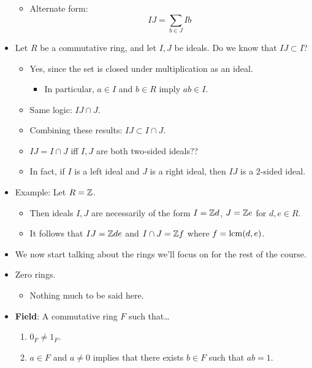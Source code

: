 \documentclass[../notes.tex]{subfiles}
\begin{document}
\begin{itemize}
\begin{itemize}
\begin{itemize}
        \end{itemize}
        \item Alternate form:
        \begin{equation*}
            IJ = \sum_{b\in J}Ib
        \end{equation*}
    \end{itemize}
    \item Let $R$ be a commutative ring, and let $I,J$ be ideals. Do we know that $IJ\subset I$?
    \begin{itemize}
        \item Yes, since the set is closed under multiplication as an ideal.
        \begin{itemize}
            \item In particular, $a\in I$ and $b\in R$ imply $ab\in I$.
        \end{itemize}
        \item Same logic: $IJ\cap J$.
        \item Combining these results: $IJ\subset I\cap J$.
        \item $IJ=I\cap J$ iff $I,J$ are both two-sided ideals??
        \item In fact, if $I$ is a left ideal and $J$ is a right ideal, then $IJ$ is a 2-sided ideal.
    \end{itemize}
    \item Example: Let $R=\mathbb{Z}$.
    \begin{itemize}
        \item Then ideals $I,J$ are necessarily of the form $I=\mathbb{Z} d$, $J=\mathbb{Z} e$ for $d,e\in R$.
        \item It follows that $IJ=\mathbb{Z} de$ and $I\cap J=\mathbb{Z} f$ where $f=\operatorname{lcm}(d,e)$.
    \end{itemize}
    \item We now start talking about the rings we'll focus on for the rest of the course.
    \item Zero rings.
    \begin{itemize}
        \item Nothing much to be said here.
    \end{itemize}
    \item \textbf{Field}: A commutative ring $F$ such that\dots
    \begin{enumerate}[label={(\roman*)}]
        \item $0_F\neq 1_F$.
        \item $a\in F$ and $a\neq 0$ implies that there exists $b\in F$ such that $ab=1$.

\end{enumerate}
\end{itemize}
\end{document}
